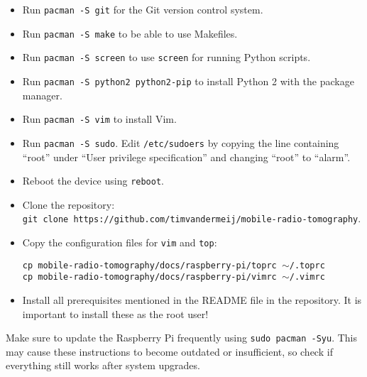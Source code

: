 \documentclass{article}
\begin{document}
\begin{itemize}
    \item Run {\tt pacman -S git} for the Git version control system.
    \item Run {\tt pacman -S make} to be able to use Makefiles.
    \item Run {\tt pacman -S screen} to use {\tt screen} for running Python
          scripts.
    \item Run {\tt pacman -S python2 python2-pip} to install Python 2 with the 
          package manager.
    \item Run {\tt pacman -S vim} to install Vim.
    \item Run {\tt pacman -S sudo}. Edit {\tt /etc/sudoers} by copying the line 
          containing ``root'' under ``User privilege specification'' and 
          changing ``root'' to ``alarm''.
    \item Reboot the device using {\tt reboot}.
    \item Clone the repository: \\ {\tt git clone 
          https://github.com/timvandermeij/mobile-radio-tomography}.
    \item Copy the configuration files for {\tt vim} and {\tt top}:
        
          {\tt cp mobile-radio-tomography/docs/raspberry-pi/toprc 
          $\sim$/.toprc} \\
          {\tt cp mobile-radio-tomography/docs/raspberry-pi/vimrc 
          $\sim$/.vimrc}
    \item Install all prerequisites mentioned in the README file in the 
          repository. It is important to install these as the root user!
\end{itemize}

Make sure to update the Raspberry Pi frequently using {\tt sudo pacman -Syu}. 
This may cause these instructions to become outdated or insufficient, so check 
if everything still works after system upgrades.
\end{document}
